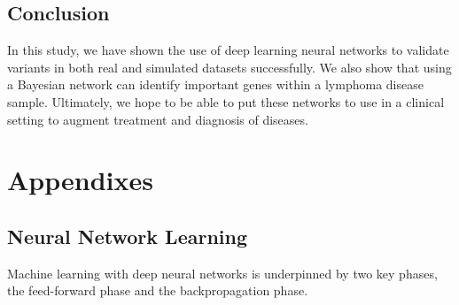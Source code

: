 \documentclass{article}
\begin{document}
\subsection{Conclusion}
In this study, we have shown the use of deep learning neural networks to validate variants in both real and simulated datasets successfully. We also show that using a Bayesian network can identify important genes within a lymphoma disease sample. Ultimately, we hope to be able to put these networks to use in a clinical setting to augment treatment and diagnosis of diseases.



\newpage
\section{Appendixes}

\subsection{Neural Network Learning}
Machine learning with deep neural networks is underpinned by two key phases, the feed-forward phase and the backpropagation phase. 
\end{document}
